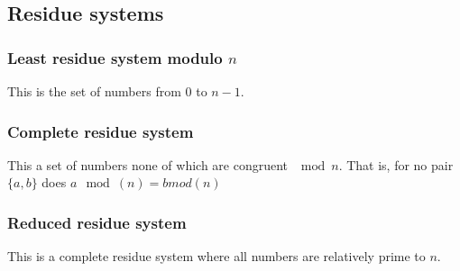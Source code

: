 
\subsection{Residue systems}

\subsubsection{Least residue system modulo \(n\)}

This is the set of numbers from \(0\) to \(n-1\).

\subsubsection{Complete residue system}

This a set of numbers none of which are congruent \(\mod n\). That is, for no pair \(\{a,b\}\) does \(a \mod(n)=b mod(n)\)

\subsubsection{Reduced residue system}

This is a complete residue system where all numbers are relatively prime to \(n\).

